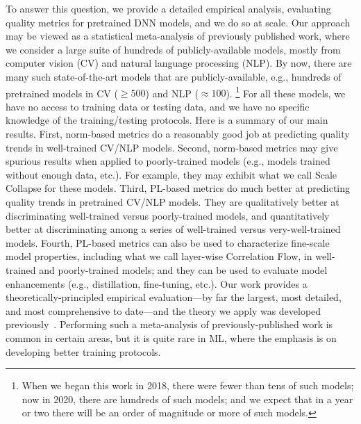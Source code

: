 To answer this question, we provide a detailed empirical analysis, evaluating quality metrics for pretrained DNN models, and we do so at scale.
Our approach may be viewed as a statistical meta-analysis of previously published work, where we consider a large suite of hundreds of publicly-available models, mostly from computer vision (CV) and natural language processing (NLP).
By now, there are many such state-of-the-art models that are publicly-available, e.g., 
hundreds of pretrained models in CV ($\ge 500$) and NLP ($\approx 100$).%
\footnote{When we began this work in 2018, there were fewer than tens of such models; now in 2020, there are hundreds of such models; and we expect that in a year or two there will be an order of magnitude or more of such models.}
For all these models, we have no access to training data or testing data, and we have no specific knowledge of the training/testing protocols. 
%
Here is a summary of our main results.
First, norm-based metrics do a reasonably good job at predicting quality trends in well-trained CV/NLP models.
Second, norm-based metrics may give spurious results when applied to poorly-trained models (e.g., models trained without enough data, etc.).
For example, they may exhibit what we call Scale Collapse for these models. 
Third, PL-based metrics do much better at predicting quality trends in pretrained CV/NLP models.  
They are qualitatively better at discriminating well-trained versus poorly-trained models, and quantitatively better at discriminating among a series of well-trained versus very-well-trained models.
Fourth, PL-based metrics can also be used to characterize fine-scale model properties, including what we call layer-wise Correlation Flow, in well-trained and poorly-trained models; and they can be used to evaluate model enhancements (e.g., distillation, fine-tuning, etc.).
%
Our work provides a theoretically-principled empirical evaluation---by far the largest, most detailed, and most comprehensive to date---and the theory we apply was developed previously~\cite{MM18_TR, MM19_HTSR_ICML, MM20_SDM}.
Performing such a meta-analysis of previously-published work is common in certain areas, but it is quite rare in ML, where the emphasis is on developing better training protocols.


